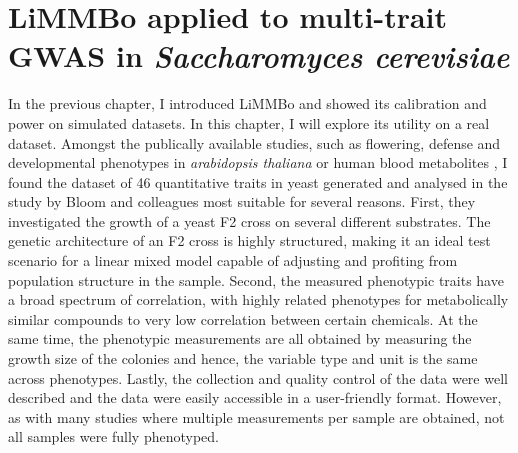 \chapter{LiMMBo applied to multi-trait GWAS  in \emph{Saccharomyces cerevisiae}}
In the previous chapter, I introduced LiMMBo and showed its calibration and power on simulated datasets. In this chapter, I will explore its utility on a real dataset. Amongst the publically available studies, such as flowering, defense and developmental phenotypes in \textit{arabidopsis thaliana} \citep{Atwell2010} or human blood metabolites \citep{Shin2014}, I found the dataset of 46 quantitative traits in yeast generated and analysed in the study by Bloom and colleagues \citep{Bloom2013} most suitable for several reasons. First, they investigated the growth of a yeast F2 cross on several different substrates.  The genetic architecture of an F2 cross is highly structured, making it an ideal test scenario for a linear mixed model capable of adjusting and profiting from population structure in the sample. Second, the measured phenotypic traits have a broad spectrum of correlation, with highly related phenotypes for metabolically similar compounds to very low correlation between certain chemicals. At the same time, the phenotypic measurements are all obtained by measuring the growth size of the colonies and hence, the variable type and unit is the same across phenotypes. Lastly, the collection and quality control of the data were well described and the data were easily accessible in a user-friendly format. However, as with many studies where multiple measurements per sample are obtained, not all samples were fully phenotyped. 

